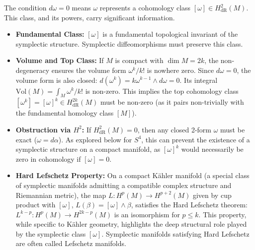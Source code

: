 \begin{remark}
\label{rem:cohom_obs}
The condition $d\omega=0$ means $\omega$ represents a cohomology class $[\omega] \in H^2_{\text{dR}}(M)$. This class, and its powers, carry significant information.
\begin{itemize}
    \item \textbf{Fundamental Class:} $[\omega]$ is a fundamental topological invariant of the symplectic structure. Symplectic diffeomorphisms must preserve this class.
    \item \textbf{Volume and Top Class:} If $M$ is compact with $\dim M = 2k$, the non-degeneracy ensures the volume form $\omega^k/k!$ is nowhere zero. Since $d\omega = 0$, the volume form is also closed: $d(\omega^k) = k \omega^{k-1} \wedge d\omega = 0$. Its integral $\text{Vol}(M) = \int_M \omega^k/k!$ is non-zero. This implies the top cohomology class $[\omega^k] = [\omega]^k \in H^{2k}_{\text{dR}}(M)$ must be non-zero (as it pairs non-trivially with the fundamental homology class $[M]$).
    \item \textbf{Obstruction via $H^2$:} If $H^2_{\text{dR}}(M) = 0$, then any closed 2-form $\omega$ must be exact ($\omega = d\alpha$). As explored below for $S^4$, this can prevent the existence of a symplectic structure on a compact manifold, as $[\omega]^k$ would necessarily be zero in cohomology if $[\omega]=0$.
    \item \textbf{Hard Lefschetz Property:} On a compact Kähler manifold (a special class of symplectic manifolds admitting a compatible complex structure and Riemannian metric), the map $L: H^p(M) \to H^{p+2}(M)$ given by cup product with $[\omega]$, $L(\beta) = [\omega] \wedge \beta$, satisfies the Hard Lefschetz theorem: $L^{k-p}: H^p(M) \to H^{2k-p}(M)$ is an isomorphism for $p \le k$. This property, while specific to Kähler geometry, highlights the deep structural role played by the symplectic class $[\omega]$. Symplectic manifolds satisfying Hard Lefschetz are often called Lefschetz manifolds.
\end{itemize}
\end{remark}

